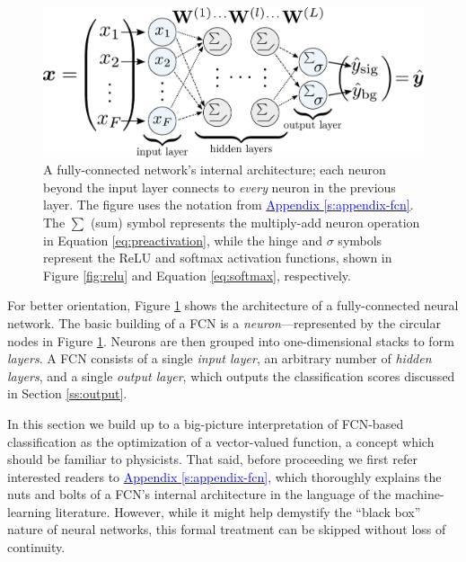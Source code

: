 \documentclass[11pt, a4paper]{article}
\newcommand{\myhref}[2]{\hyperref[#1]{\textcolor{blue}{#2}}}
\begin{document}
\begin{figure}[htb!]
    \centering
    \includegraphics[width=0.95\linewidth]{vector/fcn-architecture.pdf}
    \caption{A fully-connected network's internal architecture; each neuron beyond the input layer connects to \textit{every} neuron in the previous layer.
    The figure uses the notation from \myhref{s:appendix-fcn}{Appendix \ref{s:appendix-fcn}}.
    The $ \sum $ (sum) symbol represents the multiply-add neuron operation in Equation \ref{eq:preactivation}, while the hinge and $ \sigma $ symbols represent the ReLU and softmax activation functions, shown in Figure \ref{fig:relu} and Equation \ref{eq:softmax}, respectively.}
    \label{fig:fcn-architecture}
\end{figure}

For better orientation, Figure \ref{fig:fcn-architecture} shows the architecture of a fully-connected neural network.
The basic building of a FCN is a \textit{neuron}---represented by the circular nodes in Figure \ref{fig:fcn-architecture}.
Neurons are then grouped into one-dimensional stacks to form \textit{layers}.
A FCN consists of a single \textit{input layer}, an arbitrary number of \textit{hidden layers}, and a single \textit{output layer}, which outputs the classification scores discussed in Section \ref{ss:output}.

In this section we build up to a big-picture interpretation of FCN-based classification as the optimization of a vector-valued function, a concept which should be familiar to physicists.
That said, before proceeding we first refer interested readers to \myhref{s:appendix-fcn}{Appendix \ref{s:appendix-fcn}}, which thoroughly explains the nuts and bolts of a FCN's internal architecture in the language of the machine-learning literature.
However, while it might help demystify the ``black box'' nature of neural networks, this formal treatment can be skipped without loss of continuity.
\end{document}
